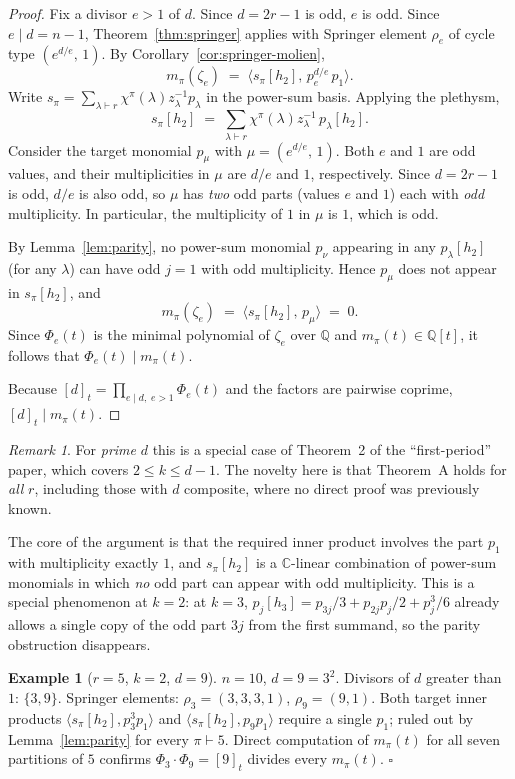 \documentclass[11pt]{article}
\theoremstyle{plain}
\theoremstyle{definition}
\newtheorem*{example}{Example}
\theoremstyle{remark}
\newtheorem*{remark}{Remark}
\newcommand{\CC}{\mathbb{C}}
\newcommand{\QQ}{\mathbb{Q}}
\begin{document}
\begin{proof}
Fix a divisor $e > 1$ of $d$.  Since $d = 2r-1$ is odd, $e$ is odd.
Since $e \mid d = n - 1$, Theorem~\ref{thm:springer} applies with
Springer element $\rho_e$ of cycle type $(e^{d/e},\, 1)$.
By Corollary~\ref{cor:springer-molien},
\[
m_\pi(\zeta_e) \;=\; \langle s_\pi[h_2],\, p_e^{d/e}\, p_1 \rangle.
\]
Write $s_\pi = \sum_{\lambda \vdash r} \chi^\pi(\lambda) z_\lambda^{-1} p_\lambda$ in the power-sum basis.
Applying the plethysm,
\[
s_\pi[h_2] \;=\; \sum_{\lambda \vdash r} \chi^\pi(\lambda) z_\lambda^{-1}\, p_\lambda[h_2].
\]
Consider the target monomial $p_\mu$ with $\mu = (e^{d/e},\, 1)$.  Both $e$ and $1$ are odd values, and their multiplicities in $\mu$ are $d/e$ and $1$, respectively.  Since $d = 2r - 1$ is odd, $d/e$ is also odd, so $\mu$ has \emph{two} odd parts (values $e$ and $1$) each with \emph{odd} multiplicity.  In particular, the multiplicity of $1$ in $\mu$ is $1$, which is odd.

By Lemma~\ref{lem:parity}, no power-sum monomial $p_\nu$ appearing in any $p_\lambda[h_2]$ (for any $\lambda$) can have odd $j = 1$ with odd multiplicity.  Hence $p_\mu$ does not appear in $s_\pi[h_2]$, and
\[
m_\pi(\zeta_e) \;=\; \langle s_\pi[h_2],\, p_\mu\rangle \;=\; 0.
\]
Since $\Phi_e(t)$ is the minimal polynomial of $\zeta_e$ over $\QQ$ and $m_\pi(t) \in \QQ[t]$, it follows that $\Phi_e(t) \mid m_\pi(t)$.

Because $[d]_t = \prod_{e \mid d,\; e > 1} \Phi_e(t)$ and the factors are pairwise coprime, $[d]_t \mid m_\pi(t)$.
\end{proof}

\begin{remark}
For \emph{prime} $d$ this is a special case of Theorem~2 of the ``first-period''
paper, which covers $2 \le k \le d - 1$.  The novelty here is that
Theorem~A holds for \emph{all} $r$, including those with $d$ composite,
where no direct proof was previously known.

The core of the argument is that the required inner product involves the
part $p_1$ with multiplicity exactly $1$, and $s_\pi[h_2]$ is a
$\CC$-linear combination of power-sum monomials in which \emph{no}
odd part can appear with odd multiplicity.  This is a special phenomenon
at $k = 2$: at $k = 3$, $p_j[h_3] = p_{3j}/3 + p_{2j} p_j / 2 + p_j^3 / 6$
already allows a single copy of the odd part $3j$ from the first summand,
so the parity obstruction disappears.
\end{remark}

\begin{example}[$r = 5$, $k = 2$, $d = 9$]
$n = 10$, $d = 9 = 3^2$.  Divisors of $d$ greater than $1$: $\{3, 9\}$.
Springer elements: $\rho_3 = (3, 3, 3, 1)$, $\rho_9 = (9, 1)$.
Both target inner products
$\langle s_\pi[h_2], p_3^3 p_1\rangle$ and $\langle s_\pi[h_2], p_9 p_1\rangle$
require a single $p_1$; ruled out by Lemma~\ref{lem:parity} for every $\pi \vdash 5$.
Direct computation of $m_\pi(t)$ for all seven partitions of $5$ confirms
$\Phi_3 \cdot \Phi_9 = [9]_t$ divides every $m_\pi(t)$.  \hfill $\square$
\end{example}
\end{document}
